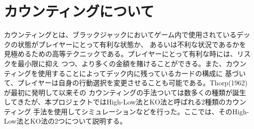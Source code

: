 
\section{カウンティングについて}
カウンティングとは、ブラックジャックにおいてゲーム内で使用されているデックの状態がプレイヤーにとって有利な状態か、
あるいは不利な状況であるかを見極めるための高等テクニックである。プレイヤーにとって有利な時には、リスクを最小限に抑え
つつ、より多くの金額を賭けることができる。また、カウンティングを使用することによってデック内に残っているカードの構成に
基づいて、プレイヤーは自身の行動選択を変更させることも可能である。Thorp(1962)が最初に発明して以来その
カウンティングの手法ついては数多くの種類が誕生してきたが、本プロジェクトではHigh-Low法とKO法と呼ばれる2種類のカウンティング
手法を使用してシミュレーションなどを行った。ここでは、そのHigh-Low法とKO法の2つについて説明する。

